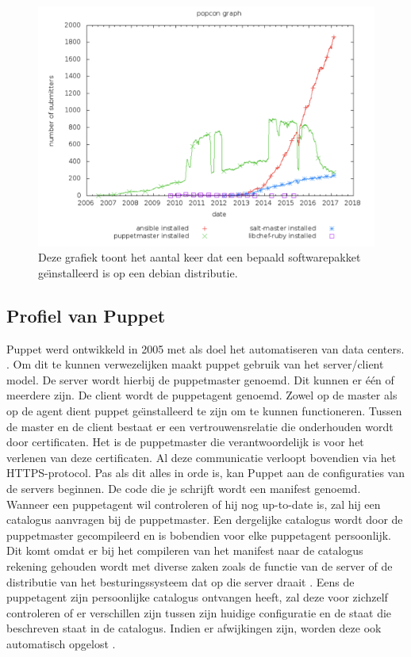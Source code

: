 \begin{figure}
  \includegraphics[width=\linewidth]{img/popcon_everybody.png}
  \caption{Deze grafiek toont het aantal keer dat een bepaald softwarepakket ge\"{\i}nstalleerd is op een debian distributie. \autocite{popcon}}
  \label{fig:popcon_everybody}
\end{figure}

\subsection{Profiel van Puppet}

Puppet werd ontwikkeld in 2005 met als doel het automatiseren van data centers. \autocite{puppetfaq}. Om dit te kunnen verwezelijken maakt puppet gebruik van  het server/client model. De server wordt hierbij de puppetmaster genoemd. Dit kunnen er   \'e\'en of meerdere zijn. De client wordt de puppetagent genoemd. Zowel op de master als op de agent dient puppet ge{\"\i}nstalleerd te zijn om te kunnen functioneren. Tussen de master en de client bestaat er een vertrouwensrelatie die onderhouden wordt door certificaten. Het is de puppetmaster die verantwoordelijk is voor het verlenen van deze certificaten. Al deze communicatie verloopt bovendien via het HTTPS-protocol. Pas als dit alles in orde is, kan Puppet  aan de configuraties van de servers beginnen. De code die je schrijft wordt een manifest genoemd. Wanneer een puppetagent wil controleren of hij nog up-to-date is, zal hij een catalogus aanvragen bij de puppetmaster. Een dergelijke catalogus wordt door de  puppetmaster gecompileerd en is bobendien voor elke puppetagent persoonlijk. Dit komt omdat er bij het compileren van het manifest naar de catalogus rekening gehouden wordt met diverse zaken zoals de functie van de server of de distributie van het besturingssysteem dat op die server draait \autocite{puppetlanguagecatalog}. Eens de puppetagent zijn persoonlijke catalogus ontvangen heeft, zal deze voor zichzelf controleren of er verschillen zijn tussen zijn huidige configuratie en de staat die beschreven staat in de catalogus. Indien er afwijkingen zijn, worden deze ook automatisch opgelost \autocite{puppetdoc}.



